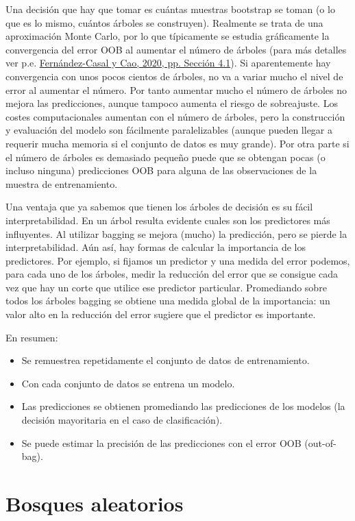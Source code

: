 \documentclass[
]{book}
\theoremstyle{break}
\theoremstyle{nonumberplain}
\begin{document}
Una decisión que hay que tomar es cuántas muestras bootstrap se toman (o lo que es lo mismo, cuántos árboles se construyen).
Realmente se trata de una aproximación Monte Carlo, por lo que típicamente se estudia gráficamente la convergencia del error OOB al aumentar el número de árboles (para más detalles ver p.e. \protect\hyperlink{ref-fernandez2020simbook}{Fernández-Casal y Cao, 2020, pp. Sección 4.1}).
Si aparentemente hay convergencia con unos pocos cientos de árboles, no va a variar mucho el nivel de error al aumentar el número.
Por tanto aumentar mucho el número de árboles no mejora las predicciones, aunque tampoco aumenta el riesgo de sobreajuste.
Los costes computacionales aumentan con el número de árboles, pero la construcción y evaluación del modelo son fácilmente paralelizables (aunque pueden llegar a requerir mucha memoria si el conjunto de datos es muy grande).
Por otra parte si el número de árboles es demasiado pequeño puede que se obtengan pocas (o incluso ninguna) predicciones OOB para alguna de las observaciones de la muestra de entrenamiento.

Una ventaja que ya sabemos que tienen los árboles de decisión es su fácil interpretabilidad.
En un árbol resulta evidente cuales son los predictores más influyentes.
Al utilizar bagging se mejora (mucho) la predicción, pero se pierde la interpretabilidad.
Aún así, hay formas de calcular la importancia de los predictores.
Por ejemplo, si fijamos un predictor y una medida del error podemos, para cada uno de los árboles, medir la reducción del error que se consigue cada vez que hay un corte que utilice ese predictor particular.
Promediando sobre todos los árboles bagging se obtiene una medida global de la importancia: un valor alto en la reducción del error sugiere que el predictor es importante.

En resumen:

\begin{itemize}
\item
  Se remuestrea repetidamente el conjunto de datos de entrenamiento.
\item
  Con cada conjunto de datos se entrena un modelo.
\item
  Las predicciones se obtienen promediando las predicciones de los
  modelos (la decisión mayoritaria en el caso de clasificación).
\item
  Se puede estimar la precisión de las predicciones con el error OOB (out-of-bag).
\end{itemize}

\hypertarget{bosques-aleatorios}{%
\section{Bosques aleatorios}\label{bosques-aleatorios}}
\end{document}
